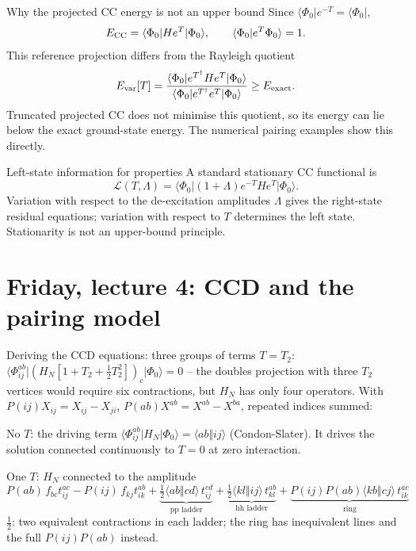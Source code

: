 \documentclass[aspectratio=169,10pt]{beamer}
\newcommand{\bra}[1]{\langle #1\vert}
\newcommand{\braket}[2]{\langle #1\vert #2\rangle}
\newcommand{\mel}[3]{\langle #1\lvert #2\rvert #3\rangle}
\newcommand{\ph}{\Phi_0}
\newcommand{\as}[4]{\langle #1#2\Vert #3#4\rangle}
\begin{document}
\begin{frame}{Why the projected CC energy is not an upper bound}
\small
Since $\bra{\ph}e^{-T}=\bra{\ph}$,
\[
 E_{\rm CC}=\mel{\ph}{He^T}{\ph},\qquad
 \braket{\ph}{e^T\ph}=1.
\]
This reference projection differs from the Rayleigh quotient
\[
 E_{\rm var}[T]=\frac{\mel{\ph}{e^{T^\dagger}He^T}{\ph}}
 {\mel{\ph}{e^{T^\dagger}e^T}{\ph}}\ge E_{\rm exact}.
\]
Truncated projected CC does not minimise this quotient, so its energy can lie below the exact ground-state energy. The numerical pairing examples show this directly.
\begin{block}{Left-state information for properties}
A standard stationary CC functional is
\[
 \mathcal L(T,\Lambda)=\mel{\ph}{(1+\Lambda)e^{-T}He^T}{\ph}.
\]
Variation with respect to the de-excitation amplitudes $\Lambda$ gives the right-state residual equations; variation with respect to $T$ determines the left state. Stationarity is not an upper-bound principle.
\end{block}
\end{frame}


\section[Friday 4: CCD]{Friday, lecture 4: CCD and the pairing model}

\begin{frame}{Deriving the CCD equations: three groups of terms}
\small
$T=T_2$: $\mel{\Phi_{ij}^{ab}}{(H_N[1+T_2+\tfrac12T_2^2])_c}{\ph}=0$ -- the doubles projection with three $T_2$ vertices would require six contractions, but $H_N$ has only four operators. With $P(ij)X_{ij}=X_{ij}-X_{ji}$, $P(ab)X^{ab}=X^{ab}-X^{ba}$, repeated indices summed:
\begin{block}{No $T$: the driving term}
$\mel{\Phi_{ij}^{ab}}{H_N}{\ph}=\as{a}{b}{i}{j}$ (Condon-Slater). It drives the solution connected continuously to $T=0$ at zero interaction.
\end{block}
\begin{block}{One $T$: $H_N$ connected to the amplitude}
\[
P(ab)\,f_{bc}t_{ij}^{ac}-P(ij)\,f_{kj}t_{ik}^{ab}
+\underbrace{\tfrac12\as{a}{b}{c}{d}\,t_{ij}^{cd}}_{\text{pp ladder}}
+\underbrace{\tfrac12\as{k}{l}{i}{j}\,t_{kl}^{ab}}_{\text{hh ladder}}
+\underbrace{P(ij)P(ab)\as{k}{b}{c}{j}\,t_{ik}^{ac}}_{\text{ring}}
\]
$\tfrac12$: two equivalent contractions in each ladder; the ring has inequivalent lines and the full $P(ij)P(ab)$ instead.
\end{block}
\end{frame}
\end{document}
